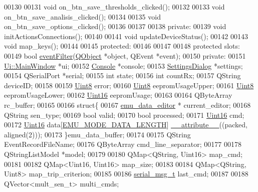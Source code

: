 \begin{DoxyCode}
00130 
00131     \textcolor{keywordtype}{void} on\_btn\_save\_thresholds\_clicked();
00132 
00133     \textcolor{keywordtype}{void} on\_btn\_save\_analisis\_clicked();
00134 
00135     \textcolor{keywordtype}{void} on\_btn\_save\_options\_clicked();
00136 
00137 
00138 \textcolor{keyword}{private}:
00139     \textcolor{keywordtype}{void} initActionsConnections();
00140 
00141     \textcolor{keywordtype}{void} updateDeviceStatus();
00142 
00143     \textcolor{keywordtype}{void} map\_keys();
00144 
00145 \textcolor{keyword}{protected}:
00146 
00147 
00148 \textcolor{keyword}{protected} slots:
00149     \textcolor{keywordtype}{bool} \hyperlink{a00017_a91df90bb5045775882c062cefdf903e9}{eventFilter}(\hyperlink{a00059}{QObject} *\textcolor{keywordtype}{object}, QEvent *event);
00150 \textcolor{keyword}{private}:
00151     \hyperlink{a00018}{Ui::MainWindow} *ui;
00152     \hyperlink{a00005}{Console} *console;
00153     \hyperlink{a00075}{SettingsDialog} *settings;
00154     QSerialPort *serial;
00155     \textcolor{keywordtype}{int} state;
00156     \textcolor{keywordtype}{int} countRx;
00157     QString deviceID;
00158 
00159     \hyperlink{a00004_a979e3e23b9a449e69ab6a8a83b6042f8}{Uint8}  error;
00160     \hyperlink{a00004_a979e3e23b9a449e69ab6a8a83b6042f8}{Uint8}  eepromUsageUpper;
00161     \hyperlink{a00004_a979e3e23b9a449e69ab6a8a83b6042f8}{Uint8}  eepromUsageLower;
00162     \hyperlink{a00004_aae7407b021d43f7193a81a58cfb3e297}{Uint16} eepromUsage;
00163 
00164     QByteArray          rc\_buffer;
00165 
00166     \textcolor{keyword}{struct}\{
00167     \hyperlink{a00008}{emu\_data\_editor} *   current\_editor;
00168     QString             sen\_type;
00169     \textcolor{keywordtype}{bool}                valid;
00170     \textcolor{keywordtype}{bool}                processed;
00171     \hyperlink{a00004_aae7407b021d43f7193a81a58cfb3e297}{Uint16}              cmd;
00172     \hyperlink{a00004_aae7407b021d43f7193a81a58cfb3e297}{Uint16}              data[\hyperlink{a00006_af4c3a8ad94feb4d7bda7f107f34baf41}{EMU\_MODE\_DATA\_LENGTH}] 
      \hyperlink{a00006_ad8187eb7fe09751a387e3dcb11c51565}{\_\_attribute\_\_}((packed, aligned(2)));
00173     \}emu\_data\_buffer;
00174 
00175     QString EventRecordFileName;
00176     QByteArray cmd\_line\_separator;
00177 
00178     QStringListModel *model;
00179 
00180     QMap<QString, Uint16> map\_cmd;
00181 
00182     QMap<Uint16, Uint16> map\_size;
00183 
00184     QMap<QString, Uint8> map\_trip\_criterion;
00185     
00186     \hyperlink{a00004_d3/dd5/a00215}{serial\_msg\_t}     last\_cmd;
00187 
00188     QVector<mult\_sen\_t> multi\_cmds;

\end{DoxyCode}
